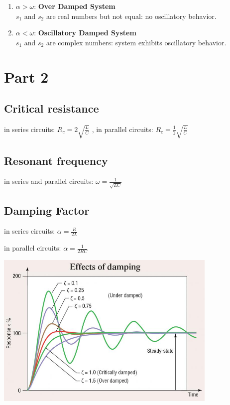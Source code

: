 \documentclass[a4paper,twoside]{report}
\newenvironment{Figure}
  {\par\medskip\minipage{\linewidth}}
  {\endminipage\par\medskip}
\begin{document}
{\begin{enumerate}
                \item
                    $\alpha > \omega$: \textbf{Over Damped System} \\
                    $s_1$ and $s_2$ are real numbers but not equal: no oscillatory behavior.

                \item
                    $\alpha < \omega$: \textbf{Oscillatory Damped System} \\
                    $s_1$ and $s_2$ are complex numbers: system exhibits oscillatory behavior.
            \end{enumerate}
        }


    \section*{Part 2}
        \subsection*{Critical resistance}
            in series circuits: $R_c = 2 \sqrt{\frac{L}{C}}$ ,
            in parallel circuits: $R_c = \frac{1}{2} \sqrt{\frac{L}{C}}$

        \subsection*{Resonant frequency}
            in series and parallel circuits: $\omega = \frac{1}{\sqrt{LC}}$
        \pagebreak
        \subsection*{Damping Factor}
            \begin{multicols}{2}\setlength{\columnseprule}{0pt}
                in series circuits: $\alpha = \frac{R}{2L}$

                in parallel circuits: $\alpha = \frac{1}{2RC}$
                \vfill\null
                \columnbreak
                \begin{Figure}
                    \includegraphics[width=0.8\textwidth]{damping.jpg}
                \end{Figure}
            \end{multicols}
\end{document}
